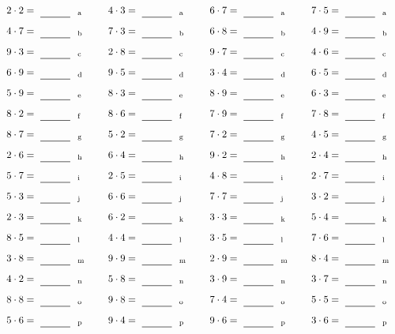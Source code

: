 \documentclass
[
  draft    = true,
  fontsize = 11pt,
  parskip  = half-
]
{scrartcl}
\begin{document}
\par\vfill\par
\begin{align*}
    \pline{2\cdot2}&=\rline{a}
  & \pline{4\cdot3}&=\rline{a}
  & \pline{6\cdot7}&=\rline{a}
  & \pline{7\cdot5}&=\rline{a} \\[1ex]
    \pline{4\cdot7}&=\rline{b}
  & \pline{7\cdot3}&=\rline{b}
  & \pline{6\cdot8}&=\rline{b}
  & \pline{4\cdot9}&=\rline{b} \\[1ex]
    \pline{9\cdot3}&=\rline{c}
  & \pline{2\cdot8}&=\rline{c}
  & \pline{9\cdot7}&=\rline{c}
  & \pline{4\cdot6}&=\rline{c} \\[1ex]
    \pline{6\cdot9}&=\rline{d}
  & \pline{9\cdot5}&=\rline{d}
  & \pline{3\cdot4}&=\rline{d}
  & \pline{6\cdot5}&=\rline{d} \\[1ex]
    \pline{5\cdot9}&=\rline{e}
  & \pline{8\cdot3}&=\rline{e}
  & \pline{8\cdot9}&=\rline{e}
  & \pline{6\cdot3}&=\rline{e} \\[1ex]
    \pline{8\cdot2}&=\rline{f}
  & \pline{8\cdot6}&=\rline{f}
  & \pline{7\cdot9}&=\rline{f}
  & \pline{7\cdot8}&=\rline{f} \\[1ex]
    \pline{8\cdot7}&=\rline{g}
  & \pline{5\cdot2}&=\rline{g}
  & \pline{7\cdot2}&=\rline{g}
  & \pline{4\cdot5}&=\rline{g} \\[1ex]
    \pline{2\cdot6}&=\rline{h}
  & \pline{6\cdot4}&=\rline{h}
  & \pline{9\cdot2}&=\rline{h}
  & \pline{2\cdot4}&=\rline{h} \\[1ex]
    \pline{5\cdot7}&=\rline{i}
  & \pline{2\cdot5}&=\rline{i}
  & \pline{4\cdot8}&=\rline{i}
  & \pline{2\cdot7}&=\rline{i} \\[1ex]
    \pline{5\cdot3}&=\rline{j}
  & \pline{6\cdot6}&=\rline{j}
  & \pline{7\cdot7}&=\rline{j}
  & \pline{3\cdot2}&=\rline{j} \\[1ex]
    \pline{2\cdot3}&=\rline{k}
  & \pline{6\cdot2}&=\rline{k}
  & \pline{3\cdot3}&=\rline{k}
  & \pline{5\cdot4}&=\rline{k} \\[1ex]
    \pline{8\cdot5}&=\rline{l}
  & \pline{4\cdot4}&=\rline{l}
  & \pline{3\cdot5}&=\rline{l}
  & \pline{7\cdot6}&=\rline{l} \\[1ex]
    \pline{3\cdot8}&=\rline{m}
  & \pline{9\cdot9}&=\rline{m}
  & \pline{2\cdot9}&=\rline{m}
  & \pline{8\cdot4}&=\rline{m} \\[1ex]
    \pline{4\cdot2}&=\rline{n}
  & \pline{5\cdot8}&=\rline{n}
  & \pline{3\cdot9}&=\rline{n}
  & \pline{3\cdot7}&=\rline{n} \\[1ex]
    \pline{8\cdot8}&=\rline{o}
  & \pline{9\cdot8}&=\rline{o}
  & \pline{7\cdot4}&=\rline{o}
  & \pline{5\cdot5}&=\rline{o} \\[1ex]
    \pline{5\cdot6}&=\rline{p}
  & \pline{9\cdot4}&=\rline{p}
  & \pline{9\cdot6}&=\rline{p}
  & \pline{3\cdot6}&=\rline{p}
\end{align*}
\end{document}
